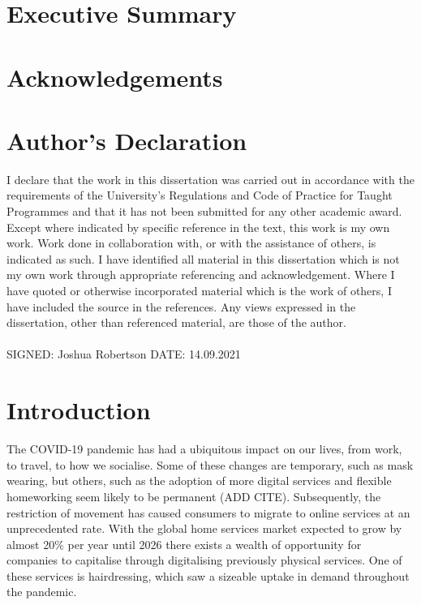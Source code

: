 \documentclass[12pt]{article}
\begin{document}
	\section*{Executive Summary}

	
	\pagebreak

	\section*{Acknowledgements}
	\pagebreak
	
	\section*{Author's Declaration}

	I declare that the work in this dissertation was carried out in accordance with the 
	requirements of the University’s Regulations and Code of Practice for Taught Programmes 
	and that it has not been submitted for any other academic award.  Except where indicated 
	by specific reference in the text, this work is my own work. Work done in collaboration with, 
	or with the assistance of others, is indicated as such. I have identified all material in this 
	dissertation which is not my own work through appropriate referencing and 
	acknowledgement. Where I have quoted or otherwise incorporated material which is the 
	work of others, I have included the source in the references.  Any views expressed in the 
	dissertation, other than referenced material, are those of the author. 
	\\
	\\
	SIGNED: Joshua Robertson DATE: 14.09.2021 
	
	\pagebreak
	
	{
		\hypersetup{linkcolor=black}
		\tableofcontents
		\pagebreak
	
		\listoffigures
		\pagebreak
	}
	
	
	\section{Introduction}


	
	
	The COVID-19 pandemic has had a ubiquitous impact on our lives, from work, to travel, to how we socialise. Some of these changes are temporary, such as mask wearing, but others, such as the adoption of more digital services and flexible homeworking seem likely to be permanent (ADD CITE). 
	Subsequently, the restriction of movement has caused consumers to migrate to online services at an unprecedented rate. With the global home services market expected to grow by almost 20\% per year until 2026 \cite{ray28StatisticsHome2021} there exists a wealth of opportunity for companies to capitalise through digitalising previously physical services. One of these services is hairdressing, which saw a sizeable uptake in demand throughout the pandemic. 
	\\
	
\end{document}
